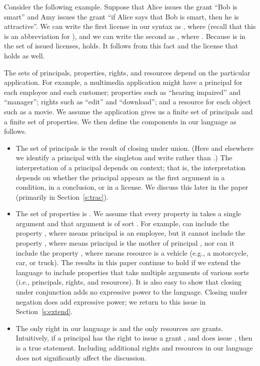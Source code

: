 \documentclass{acmtrans2m}
\newcommand{\<}{
}
\renewcommand{\>}{\rangle}
\begin{document}
\begin{sloppypar}
Consider the following example.  Suppose that Alice issues the grant ``Bob is smart''
and Amy issues the grant ``if Alice says that Bob is smart, then he is attractive''.  We
can write the first license in our syntax as , where
 (recall that this is an abbreviation for
), and we can write the second as
, where .  Because  is in the set of issued licenses,
 holds.  It follows from this fact and the
license  that  holds as
well.
\end{sloppypar}

The sets of principals, properties, rights, and resources depend on the particular application.
For example, a multimedia application might have a principal for each employee and each
customer; properties such as ``hearing impaired'' and ``manager''; rights such as ``edit'' and
``download''; and a resource for each object such as a movie.  We assume the application gives us
a finite set  of principals and a finite set  of properties.  We
then define the components in our language as follows.
\begin{itemize}
\item The set  of principals is the result of closing  under union.  (Here and
elsewhere we identify a principal  with the singleton  and write
 rather than .)  The interpretation of a
principal  depends on context; that is, the interpretation depends on whether
the principal appears as the first argument in a  condition, in a conclusion, or in a
license.  We discuss this later in the paper (primarily in Section~\ref{s:trac}).
\item The set of properties is .
We assume that
every property in 
takes a single argument and that argument is of sort .  For example,  can
include the property , where  means principal 
is an employee, but it cannot include the property , where
 means principal  is the mother of principal , nor can it include
the property , where  means resource  is a vehicle
(e.g., a motorcycle, car, or truck).  The results in this paper continue to hold if we extend the
language to include properties that take multiple arguments of various sorts (i.e., principals,
rights, and resources).  It is also easy to show that closing  under conjunction adds
no expressive power to the language.  Closing under negation does add expressive power; we return to
this issue in Section~\ref{s:extend}.
\item The only right in our language is  and the only resources are grants.  Intuitively, if
a principal  has the right to issue a grant , and  does issue , then  is a true
statement.  Including additional rights and resources in our language does not significantly affect
the discussion.
\end{itemize}
\end{document}
